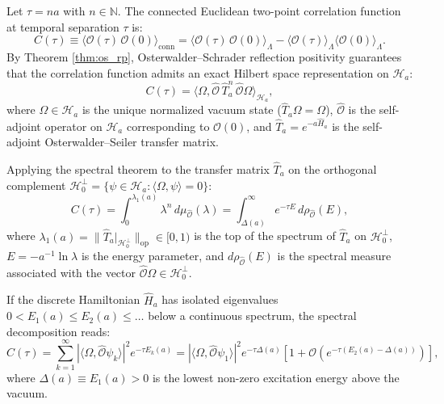 Let $\tau = n a$ with $n \in \mathbb{N}$. The connected Euclidean two-point correlation function at temporal separation $\tau$ is:
\begin{equation}
\label{eq:connected_correlator}
C(\tau) \equiv \langle \mathcal{O}(\tau) \, \mathcal{O}(0) \rangle_{\mathrm{conn}} = \langle \mathcal{O}(\tau) \, \mathcal{O}(0) \rangle_\Lambda - \langle \mathcal{O}(\tau) \rangle_\Lambda \langle \mathcal{O}(0) \rangle_\Lambda.
\end{equation}
By Theorem \ref{thm:os_rp}, Osterwalder--Schrader reflection positivity guarantees that the correlation function admits an exact Hilbert space representation on $\mathcal{H}_a$:
\begin{equation}
\label{eq:correlator_transfer_matrix}
C(\tau) = \langle \Omega, \hat{\mathcal{O}} \, \hat{T}_a^n \, \hat{\mathcal{O}} \Omega \rangle_{\mathcal{H}_a},
\end{equation}
where $\Omega \in \mathcal{H}_a$ is the unique normalized vacuum state ($\hat{T}_a \Omega = \Omega$), $\hat{\mathcal{O}}$ is the self-adjoint operator on $\mathcal{H}_a$ corresponding to $\mathcal{O}(0)$, and $\hat{T}_a = e^{-a \hat{H}_a}$ is the self-adjoint Osterwalder--Seiler transfer matrix.

Applying the spectral theorem to the transfer matrix $\hat{T}_a$ on the orthogonal complement $\mathcal{H}_0^\perp = \{\psi \in \mathcal{H}_a : \langle \Omega, \psi \rangle = 0\}$:
\begin{equation}
\label{eq:spectral_integral_correlator}
C(\tau) = \int_0^{\lambda_1(a)} \lambda^n \, d\mu_{\hat{\mathcal{O}}}(\lambda) = \int_{\Delta(a)}^\infty e^{-\tau E} \, d\rho_{\hat{\mathcal{O}}}(E),
\end{equation}
where $\lambda_1(a) = \|\hat{T}_a|_{\mathcal{H}_0^\perp}\|_{\mathrm{op}} \in [0, 1)$ is the top of the spectrum of $\hat{T}_a$ on $\mathcal{H}_0^\perp$, $E = -a^{-1} \ln \lambda$ is the energy parameter, and $d\rho_{\hat{\mathcal{O}}}(E)$ is the spectral measure associated with the vector $\hat{\mathcal{O}} \Omega \in \mathcal{H}_0^\perp$.

If the discrete Hamiltonian $\hat{H}_a$ has isolated eigenvalues $0 < E_1(a) \le E_2(a) \le \dots$ below a continuous spectrum, the spectral decomposition reads:
\begin{equation}
\label{eq:spectral_discrete_sum}
C(\tau) = \sum_{k=1}^\infty |\langle \Omega, \hat{\mathcal{O}} \psi_k \rangle|^2 e^{-\tau E_k(a)} = |\langle \Omega, \hat{\mathcal{O}} \psi_1 \rangle|^2 e^{-\tau \Delta(a)} \left[ 1 + \mathcal{O}\left( e^{-\tau (E_2(a) - \Delta(a))} \right) \right],
\end{equation}
where $\Delta(a) \equiv E_1(a) > 0$ is the lowest non-zero excitation energy above the vacuum.

